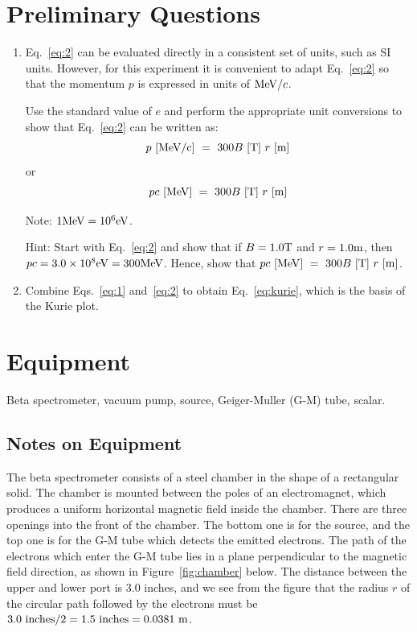 \section{Preliminary Questions}
\begin{enumerate}
\item Eq.~\ref{eq:2} can be evaluated directly in a consistent set of units,
such as SI units.  However, for this experiment it is convenient to
adapt Eq.~\ref{eq:2} so that the momentum $p$ is expressed in units of ${\rm MeV}/c$.

Use the standard value of $e$ and perform the appropriate unit conversions
to show that Eq.~\ref{eq:2} can be written as:
\begin{equation}
p~{\rm [MeV/c]} ~=~ 300 B~{\rm [T]}~r~{\rm [m]}
\end{equation}
or
\begin{equation}
pc~{\rm [MeV]} ~=~ 300 B~{\rm [T]}~r~{\rm [m]}
\end{equation}

Note: $1 {\rm MeV} = 10^6 {\rm eV}$.

Hint: Start with Eq.~\ref{eq:2} and show that if $B = 1.0 {\rm T}$ and $r = 1.0 {\rm m}$, then
$pc =  3.0 \times 10^8 {\rm eV} = 300 {\rm MeV}$.  Hence, show that
$pc~{\rm [MeV]} ~=~ 300 B~{\rm [T]}~r~{\rm [m]}$.

\item Combine Eqs.~\ref{eq:1} and~\ref{eq:2} to obtain Eq.~\ref{eq:kurie}, which is the basis of
the Kurie plot.

\end{enumerate}


\section{Equipment}
Beta spectrometer, vacuum pump, \cs source, Geiger-Muller
(G-M) tube, scalar.

\subsection{Notes on Equipment}

The beta spectrometer consists of a steel chamber in the shape of a
rectangular solid.  The chamber is mounted between the poles of an
electromagnet, which produces a uniform horizontal magnetic field
inside the chamber.  There are three openings into the front of the
chamber. The bottom one is for the \cs source, and the top one is
for the G-M tube which detects the emitted electrons.  The path of the
electrons which enter the G-M tube lies in a plane perpendicular to the
magnetic field direction, as shown in Figure~\ref{fig:chamber} below.  The distance
between the upper and lower port is 3.0 inches, and we see from the
figure that the radius $r$ of the circular path followed by the electrons
must be $3.0~{\rm inches}/2 = 1.5~{\rm inches} =  0.0381~{\rm m}$.

